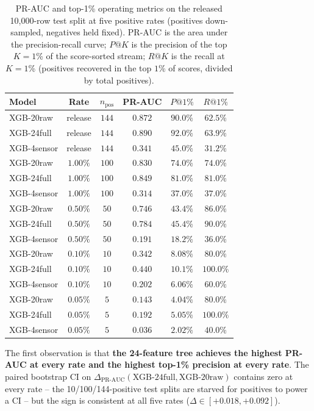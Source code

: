 \documentclass{article}
\begin{document}
\begin{table}[t]
\centering
\small
\caption{PR-AUC and top-1\% operating metrics on the released
10{,}000-row test split at five positive rates (positives
down-sampled, negatives held fixed). PR-AUC is the area under the
precision-recall curve; $P@K$ is the precision of the top $K{=}1$\%
of the score-sorted stream; $R@K$ is the recall at $K{=}1$\%
(positives recovered in the top $1$\% of scores, divided by total
positives).}
\label{tab:p8-evidence-pr-realistic}
\begin{tabular}{lccccc}
\toprule
Model & Rate & $n_{\text{pos}}$ & PR-AUC & $P@1\%$ & $R@1\%$ \\
\midrule
XGB-20raw   & release & $144$ & $0.872$ & $90.0\%$ & $62.5\%$ \\
XGB-24full  & release & $144$ & $0.890$ & $92.0\%$ & $63.9\%$ \\
XGB-4sensor & release & $144$ & $0.341$ & $45.0\%$ & $31.2\%$ \\
\midrule
XGB-20raw   & $1.00\%$ & $100$ & $0.830$ & $74.0\%$ & $74.0\%$ \\
XGB-24full  & $1.00\%$ & $100$ & $0.849$ & $81.0\%$ & $81.0\%$ \\
XGB-4sensor & $1.00\%$ & $100$ & $0.314$ & $37.0\%$ & $37.0\%$ \\
\midrule
XGB-20raw   & $0.50\%$ & $50$  & $0.746$ & $43.4\%$ & $86.0\%$ \\
XGB-24full  & $0.50\%$ & $50$  & $0.784$ & $45.4\%$ & $90.0\%$ \\
XGB-4sensor & $0.50\%$ & $50$  & $0.191$ & $18.2\%$ & $36.0\%$ \\
\midrule
XGB-20raw   & $0.10\%$ & $10$  & $0.342$ & $8.08\%$ & $80.0\%$ \\
XGB-24full  & $0.10\%$ & $10$  & $0.440$ & $10.1\%$ & $100.0\%$ \\
XGB-4sensor & $0.10\%$ & $10$  & $0.202$ & $6.06\%$ & $60.0\%$ \\
\midrule
XGB-20raw   & $0.05\%$ & $5$   & $0.143$ & $4.04\%$ & $80.0\%$ \\
XGB-24full  & $0.05\%$ & $5$   & $0.192$ & $5.05\%$ & $100.0\%$ \\
XGB-4sensor & $0.05\%$ & $5$   & $0.036$ & $2.02\%$ & $40.0\%$ \\
\bottomrule
\end{tabular}
\end{table}

The first observation is that \textbf{the 24-feature tree achieves the
highest PR-AUC at every rate and the highest top-1\% precision at every
rate}. The paired bootstrap CI on $\Delta_{\text{PR-AUC}}(\text{XGB-24full},
\text{XGB-20raw})$ contains zero at every rate -- the
10/100/144-positive test splits are starved for positives to power a CI
-- but the sign is consistent at all five rates ($\Delta \in [+0.018,
+0.092]$).
\end{document}
